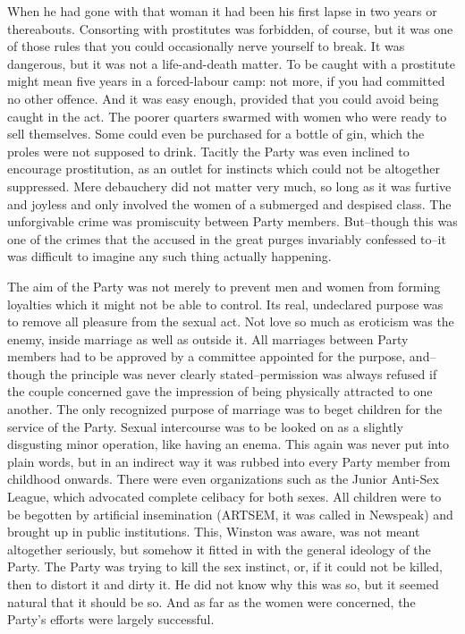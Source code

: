 \documentclass{article}
\begin{document}
When he had gone with that woman it had been his first lapse in two years
or thereabouts. Consorting with prostitutes was forbidden, of course, but
it was one of those rules that you could occasionally nerve yourself to
break. It was dangerous, but it was not a life-and-death matter. To be
caught with a prostitute might mean five years in a forced-labour camp:
not more, if you had committed no other offence. And it was easy enough,
provided that you could avoid being caught in the act. The poorer quarters
swarmed with women who were ready to sell themselves. Some could even be
purchased for a bottle of gin, which the proles were not supposed to drink.
Tacitly the Party was even inclined to encourage prostitution, as an outlet
for instincts which could not be altogether suppressed. Mere debauchery
did not matter very much, so long as it was furtive and joyless and only
involved the women of a submerged and despised class. The unforgivable
crime was promiscuity between Party members. But--though this was one
of the crimes that the accused in the great purges invariably confessed
to--it was difficult to imagine any such thing actually happening.

The aim of the Party was not merely to prevent men and women from forming
loyalties which it might not be able to control. Its real, undeclared
purpose was to remove all pleasure from the sexual act. Not love so much
as eroticism was the enemy, inside marriage as well as outside it. All
marriages between Party members had to be approved by a committee
appointed for the purpose, and--though the principle was never clearly
stated--permission was always refused if the couple concerned gave
the impression of being physically attracted to one another. The only
recognized purpose of marriage was to beget children for the service of
the Party. Sexual intercourse was to be looked on as a slightly disgusting
minor operation, like having an enema. This again was never put into plain
words, but in an indirect way it was rubbed into every Party member from
childhood onwards. There were even organizations such as the Junior
Anti-Sex League, which advocated complete celibacy for both sexes. All
children were to be begotten by artificial insemination (ARTSEM, it was
called in Newspeak) and brought up in public institutions. This, Winston
was aware, was not meant altogether seriously, but somehow it fitted in
with the general ideology of the Party. The Party was trying to kill the
sex instinct, or, if it could not be killed, then to distort it and dirty
it. He did not know why this was so, but it seemed natural that it should
be so. And as far as the women were concerned, the Party's efforts were
largely successful.
\end{document}
